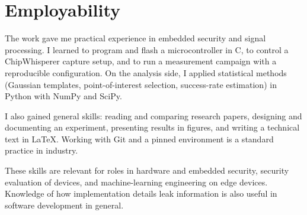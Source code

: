 \chapter{Employability}
\label{chap:employability}

The work gave me practical experience in embedded security and signal processing.
I learned to program and flash a microcontroller in C, to control a ChipWhisperer capture setup, and to run a measurement campaign with a reproducible configuration.
On the analysis side, I applied statistical methods (Gaussian templates, point-of-interest selection, success-rate estimation) in Python with NumPy and SciPy.

I also gained general skills: reading and comparing research papers, designing and documenting an experiment, presenting results in figures, and writing a technical text in \LaTeX{}.
Working with Git and a pinned environment is a standard practice in industry.

These skills are relevant for roles in hardware and embedded security, security evaluation of devices, and machine-learning engineering on edge devices.
Knowledge of how implementation details leak information is also useful in software development in general.
